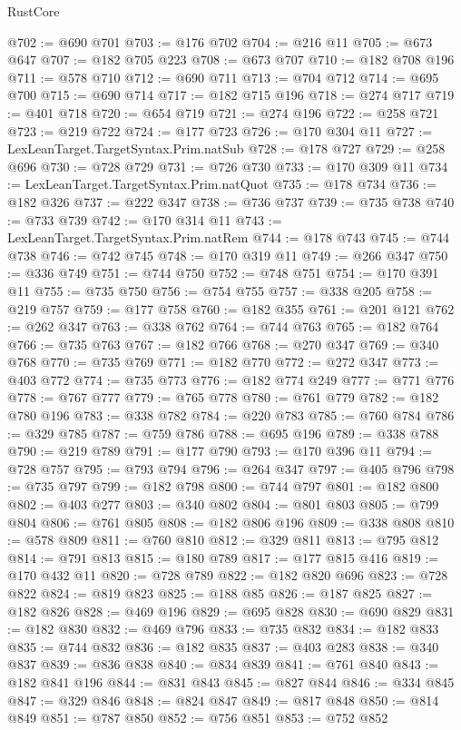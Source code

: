 \begin{lexlean}{RustCore}
\begin{coremodule}
@702 := @690 @701
@703 := @176 @702
@704 := @216 @11
@705 := @673 @647
@707 := @182 @705 @223
@708 := @673 @707
@710 := @182 @708 @196
@711 := @578 @710
@712 := @690 @711
@713 := @704 @712
@714 := @695 @700
@715 := @690 @714
@717 := @182 @715 @196
@718 := @274 @717
@719 := @401 @718
@720 := @654 @719
@721 := @274 @196
@722 := @258 @721
@723 := @219 @722
@724 := @177 @723
@726 := @170 @304 @11
@727 := LexLeanTarget.TargetSyntax.Prim.natSub
@728 := @178 @727
@729 := @258 @696
@730 := @728 @729
@731 := @726 @730
@733 := @170 @309 @11
@734 := LexLeanTarget.TargetSyntax.Prim.natQuot
@735 := @178 @734
@736 := @182 @326
@737 := @222 @347
@738 := @736 @737
@739 := @735 @738
@740 := @733 @739
@742 := @170 @314 @11
@743 := LexLeanTarget.TargetSyntax.Prim.natRem
@744 := @178 @743
@745 := @744 @738
@746 := @742 @745
@748 := @170 @319 @11
@749 := @266 @347
@750 := @336 @749
@751 := @744 @750
@752 := @748 @751
@754 := @170 @391 @11
@755 := @735 @750
@756 := @754 @755
@757 := @338 @205
@758 := @219 @757
@759 := @177 @758
@760 := @182 @355
@761 := @201 @121
@762 := @262 @347
@763 := @338 @762
@764 := @744 @763
@765 := @182 @764
@766 := @735 @763
@767 := @182 @766
@768 := @270 @347
@769 := @340 @768
@770 := @735 @769
@771 := @182 @770
@772 := @272 @347
@773 := @403 @772
@774 := @735 @773
@776 := @182 @774 @249
@777 := @771 @776
@778 := @767 @777
@779 := @765 @778
@780 := @761 @779
@782 := @182 @780 @196
@783 := @338 @782
@784 := @220 @783
@785 := @760 @784
@786 := @329 @785
@787 := @759 @786
@788 := @695 @196
@789 := @338 @788
@790 := @219 @789
@791 := @177 @790
@793 := @170 @396 @11
@794 := @728 @757
@795 := @793 @794
@796 := @264 @347
@797 := @405 @796
@798 := @735 @797
@799 := @182 @798
@800 := @744 @797
@801 := @182 @800
@802 := @403 @277
@803 := @340 @802
@804 := @801 @803
@805 := @799 @804
@806 := @761 @805
@808 := @182 @806 @196
@809 := @338 @808
@810 := @578 @809
@811 := @760 @810
@812 := @329 @811
@813 := @795 @812
@814 := @791 @813
@815 := @180 @789
@817 := @177 @815 @416
@819 := @170 @432 @11
@820 := @728 @789
@822 := @182 @820 @696
@823 := @728 @822
@824 := @819 @823
@825 := @188 @85
@826 := @187 @825
@827 := @182 @826
@828 := @469 @196
@829 := @695 @828
@830 := @690 @829
@831 := @182 @830
@832 := @469 @796
@833 := @735 @832
@834 := @182 @833
@835 := @744 @832
@836 := @182 @835
@837 := @403 @283
@838 := @340 @837
@839 := @836 @838
@840 := @834 @839
@841 := @761 @840
@843 := @182 @841 @196
@844 := @831 @843
@845 := @827 @844
@846 := @334 @845
@847 := @329 @846
@848 := @824 @847
@849 := @817 @848
@850 := @814 @849
@851 := @787 @850
@852 := @756 @851
@853 := @752 @852

\end{coremodule}
\end{lexlean}
